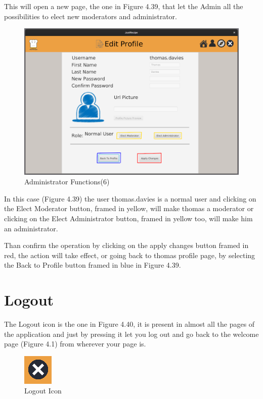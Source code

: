 \documentclass[a4paper]{report}
\begin{document}
\noindent This will open a new page, the one in Figure 4.39, that let the Admin all the possibilities to elect new moderators and administrator.
\begin{figure}[htpb]
	\centering
	\includegraphics[scale=0.37]{img/user_manual/administratorFunction6.png}
	\caption{Administrator Functions(6)}
\end{figure}

\noindent In this case (Figure 4.39) the user thomas.davies is a normal user and clicking on the Elect Moderator button, framed in yellow, will make thomas a moderator or clicking on the Elect Administrator button, framed in yellow too, will make him an administrator.

\noindent Than confirm the operation by clicking on the apply changes button framed in red, the action will take effect, or going back to thomas profile page, by selecting the Back to Profile button framed in blue in Figure 4.39.

\section{Logout}
The Logout icon is the one in Figure 4.40, it is present in almost all the pages of the application and just by pressing it let you log out and go back to the welcome page (Figure 4.1) from wherever your page is.
\begin{figure}[htpb]
	\centering
	\includegraphics[scale=0.37]{img/user_manual/logoutIcon.png}
	\caption{Logout Icon}
\end{figure}
\end{document}
